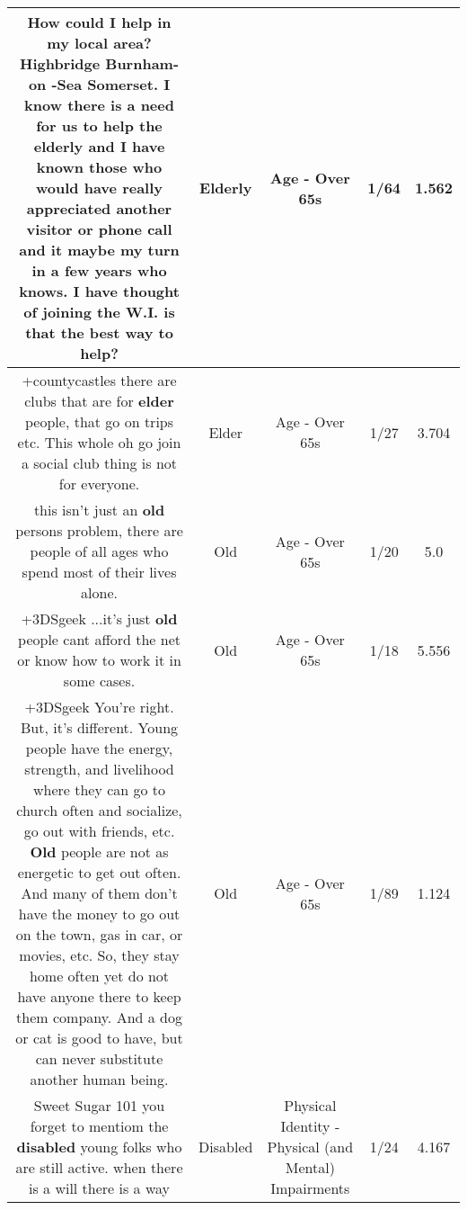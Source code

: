 \documentclass[11pt]{article}
\newlength\mylength
\begin{document}
\begin{center}
\begin{longtable}{|C{.65\mylength}|C{.30\mylength}|C{.12\mylength}|C{.12\mylength}|C{.12\mylength}|}
  \small How could I help in my local area? Highbridge Burnham-on -Sea Somerset. I know there is a need for us to help the \textbf{elderly} and I have known those who would have really appreciated another visitor or phone call and it maybe my turn in a few years who knows. I have thought of joining the W.I. is that the best way to help?\normalsize   & Elderly & Age - Over 65s & 1/64 & 1.562 \\  \hline
  \small +countycastles there are clubs that are for \textbf{elder} people, that go on trips etc. This whole oh go join a social club thing is not for everyone.\normalsize   & Elder & Age - Over 65s & 1/27 & 3.704 \\  \hline
  \small this isn't just an \textbf{old} persons problem, there are people of all ages who spend most of their lives alone.\normalsize   & Old & Age - Over 65s & 1/20 & 5.0 \\  \hline
  \small +3DSgeek ...it's just \textbf{old} people cant afford the net or know how to work it in some cases.\normalsize   & Old & Age - Over 65s & 1/18 & 5.556 \\  \hline
  \small +3DSgeek You're right. But, it's different. Young people have the energy, strength, and livelihood where they can go to church often and socialize, go out with friends, etc. \textbf{Old} people are not as energetic to get out often. And many of them don't have the money to go out on the town, gas in car, or movies, etc. So, they stay home often yet do not have anyone there to keep them company. And a dog or cat is good to have, but can never substitute another human being.\normalsize   & Old & Age - Over 65s & 1/89 & 1.124 \\  \hline
  \small Sweet Sugar 101 you forget to mentiom the \textbf{disabled} young folks who are still active. when there is a will there is a way\normalsize   & Disabled & Physical Identity - Physical (and Mental) Impairments & 1/24 & 4.167 \\  \hline

\end{longtable}
\end{center}
\end{document}
